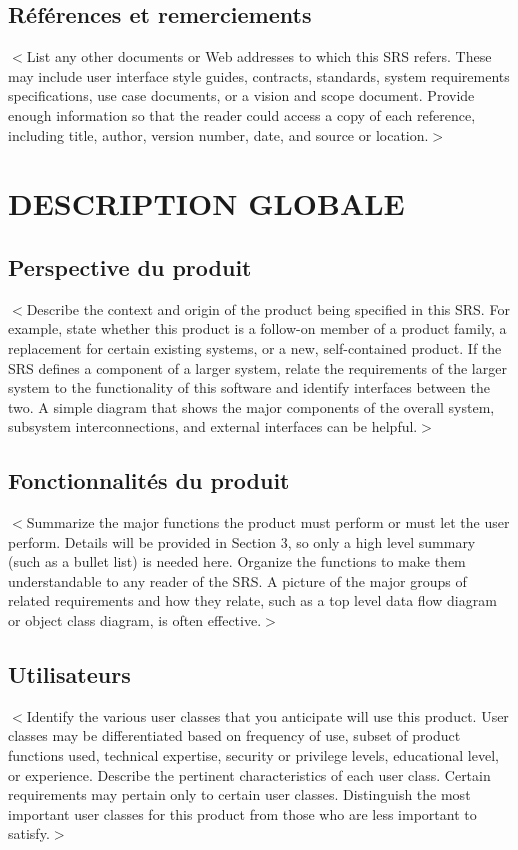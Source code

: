 \documentclass{scrreprt}
\begin{document}
\section{Références et remerciements}
$<$List any other documents or Web addresses to which this SRS refers. These may 
include user interface style guides, contracts, standards, system requirements 
specifications, use case documents, or a vision and scope document. Provide 
enough information so that the reader could access a copy of each reference, 
including title, author, version number, date, and source or location.$>$


\chapter{DESCRIPTION GLOBALE }

\section{Perspective du produit}
$<$Describe the context and origin of the product being specified in this SRS.  
For example, state whether this product is a follow-on member of a product 
family, a replacement for certain existing systems, or a new, self-contained 
product. If the SRS defines a component of a larger system, relate the 
requirements of the larger system to the functionality of this software and 
identify interfaces between the two. A simple diagram that shows the major 
components of the overall system, subsystem interconnections, and external 
interfaces can be helpful.$>$

\section{Fonctionnalités du produit}
$<$Summarize the major functions the product must perform or must let the user 
perform. Details will be provided in Section 3, so only a high level summary 
(such as a bullet list) is needed here. Organize the functions to make them 
understandable to any reader of the SRS. A picture of the major groups of 
related requirements and how they relate, such as a top level data flow diagram 
or object class diagram, is often effective.$>$

\section{Utilisateurs}
$<$Identify the various user classes that you anticipate will use this product.  
User classes may be differentiated based on frequency of use, subset of product 
functions used, technical expertise, security or privilege levels, educational 
level, or experience. Describe the pertinent characteristics of each user class.  
Certain requirements may pertain only to certain user classes. Distinguish the 
most important user classes for this product from those who are less important 
to satisfy.$>$
\end{document}
